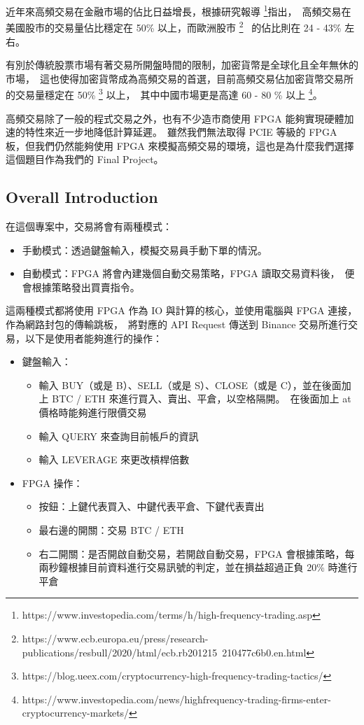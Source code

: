 \documentclass[10.5pt,compsoc,UTF8]{CjC}
\theoremstyle{mystyle}
\begin{document}
近年來高頻交易在金融市場的佔比日益增長，根據研究報導 \footnote{https://www.investopedia.com/terms/h/high-frequency-trading.asp}指出，\
高頻交易在美國股市的交易量佔比穩定在 50\% 以上，而歐洲股市 \footnote{https://www.ecb.europa.eu/press/research-publications/resbull/2020/html/ecb.rb201215~210477c6b0.en.html} \
的佔比則在 24 - 43\% 左右。\

有別於傳統股票市場有著交易所開盤時間的限制，加密貨幣是全球化且全年無休的市場，\
這也使得加密貨幣成為高頻交易的首選，目前高頻交易佔加密貨幣交易所的交易量穩定在 50\% \footnote{https://blog.ueex.com/cryptocurrency-high-frequency-trading-tactics/} 以上，\
其中中國市場更是高達 60 - 80 \% 以上 \footnote{https://www.investopedia.com/news/highfrequency-trading-firms-enter-cryptocurrency-markets/}。

高頻交易除了一般的程式交易之外，也有不少造市商使用 FPGA 能夠實現硬體加速的特性來近一步地降低計算延遲。\
雖然我們無法取得 PCIE 等級的 FPGA 板，但我們仍然能夠使用 FPGA 來模擬高頻交易的環境，這也是為什麼我們選擇這個題目作為我們的 Final Project。

\subsection{Overall Introduction}
在這個專案中，交易將會有兩種模式：
\begin{itemize}
  \item 手動模式：透過鍵盤輸入，模擬交易員手動下單的情況。
  \item 自動模式：FPGA 將會內建幾個自動交易策略，FPGA 讀取交易資料後，\
  便會根據策略發出買賣指令。
\end{itemize}

這兩種模式都將使用 FPGA 作為 IO 與計算的核心，並使用電腦與 FPGA 連接，作為網路封包的傳輸跳板，\
將對應的 API Request 傳送到 Binance 交易所進行交易，以下是使用者能夠進行的操作：

\begin{itemize}
  \item 鍵盤輸入：
  \begin{itemize}
    \item 輸入 BUY（或是 B）、SELL（或是 S）、CLOSE（或是 C），並在後面加上 BTC / ETH 來進行買入、賣出、平倉，以空格隔開。\
    在後面加上 at 價格時能夠進行限價交易
    \item 輸入 QUERY 來查詢目前帳戶的資訊
    \item 輸入 LEVERAGE 來更改槓桿倍數
  \end{itemize}
\end{itemize}
\newpage
\begin{itemize}
  \item FPGA 操作：
  \begin{itemize}
    \item 按鈕：上鍵代表買入、中鍵代表平倉、下鍵代表賣出
    \item 最右邊的開關：交易 BTC / ETH
    \item 右二開關：是否開啟自動交易，若開啟自動交易，FPGA 會根據策略，每兩秒鐘根據目前資料進行交易訊號的判定，並在損益超過正負 20\% 時進行平倉
  \end{itemize}
\end{itemize}
\end{document}
